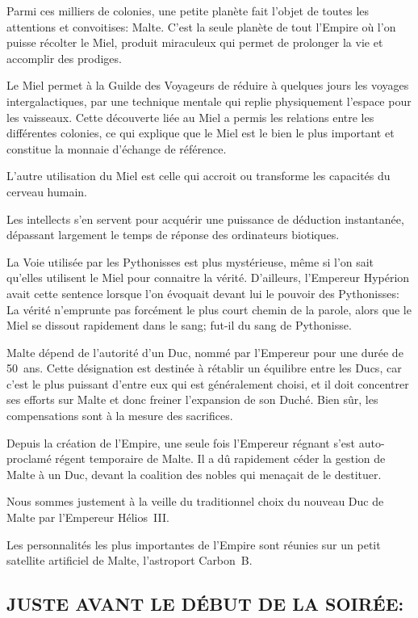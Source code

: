\documentclass[14pt,twocolumn]{extarticle}
\begin{document}
Parmi ces milliers de colonies, une petite planète fait l'objet de toutes les
attentions et convoitises: Malte. C'est la seule planète de tout l'Empire où
l'on puisse récolter le Miel, produit miraculeux qui permet de prolonger la vie
et accomplir des prodiges.

Le Miel permet à la Guilde des Voyageurs de réduire à quelques jours les
voyages intergalactiques, par une technique mentale qui replie physiquement
l'espace pour les vaisseaux. Cette découverte liée au Miel a permis les
relations entre les différentes colonies, ce qui explique que le Miel est le
bien le plus important et constitue la monnaie d'échange de référence.

L'autre utilisation du Miel est celle qui accroit ou transforme les capacités
du cerveau humain.

Les intellects s'en servent pour acquérir une puissance de déduction
instantanée, dépassant largement le temps de réponse des ordinateurs biotiques.

La Voie utilisée par les Pythonisses est plus mystérieuse, même si l'on sait
qu'elles utilisent le Miel pour connaitre la vérité. D'ailleurs, l'Empereur
Hypérion avait cette sentence lorsque l'on évoquait devant lui le pouvoir des
Pythonisses: \og La vérité n'emprunte pas forcément le plus court chemin de la
parole, alors que le Miel se dissout rapidement dans le sang; fut-il du
sang de Pythonisse\fg{}.

Malte dépend de l'autorité d'un Duc, nommé par l'Empereur pour une durée de
50~ans. Cette désignation est destinée à rétablir un équilibre entre les Ducs,
car c'est le plus puissant d'entre eux qui est généralement choisi, et il doit
concentrer ses efforts sur Malte et donc freiner l'expansion de son Duché.
Bien sûr, les compensations sont à la mesure des sacrifices.

Depuis la création de l'Empire, une seule fois l'Empereur régnant s'est
auto-proclamé régent temporaire de Malte. Il a dû rapidement céder la gestion
de Malte à un Duc, devant la coalition des nobles qui menaçait de le destituer.

Nous sommes justement à la veille du traditionnel choix du nouveau Duc de Malte
par l'Empereur Hélios~III.

Les personnalités les plus importantes de l'Empire sont réunies sur un petit
satellite artificiel de Malte, l'astroport Carbon~B.

\subsection{JUSTE AVANT LE DÉBUT DE LA SOIRÉE:}
\end{document}
